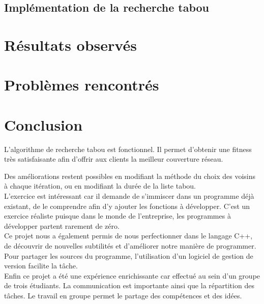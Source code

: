 \documentclass[a4paper, 11pt]{report}
\begin{document}
\section{Implémentation de la recherche tabou}

\chapter{Résultats observés}

\chapter{Problèmes rencontrés}

\chapter{Conclusion}
L'algorithme de recherche tabou est fonctionnel. Il permet d'obtenir une fitness très satisfaisante afin d'offrir aux clients la meilleur couverture réseau.

Des améliorations restent possibles en modifiant la méthode du choix des voisins à chaque itération, ou en modifiant la durée de la liste tabou.\\

L'exercice est intéressant car il demande de s'immiscer dans un programme déjà existant, de le comprendre afin d'y ajouter les fonctions à développer. C'est un exercice réaliste puisque dans le monde de l'entreprise, les programmes à développer partent rarement de zéro.\\

Ce projet nous a également permis de nous perfectionner dans le langage C++, de découvrir de nouvelles subtilités et d'améliorer notre manière de programmer. Pour partager les sources du programme, l'utilisation d'un logiciel de gestion de version facilite la tâche.\\

Enfin ce projet a été une expérience enrichissante car effectué au sein d'un groupe de trois étudiants. La communication est importante ainsi que la répartition des tâches. Le travail en groupe permet le partage des compétences et des idées. \\

\appendix
\end{document}

